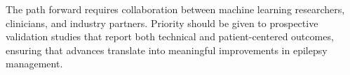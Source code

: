 The path forward requires collaboration between machine learning researchers, clinicians, and industry partners. Priority should be given to prospective validation studies that report both technical and patient-centered outcomes, ensuring that advances translate into meaningful improvements in epilepsy management.
